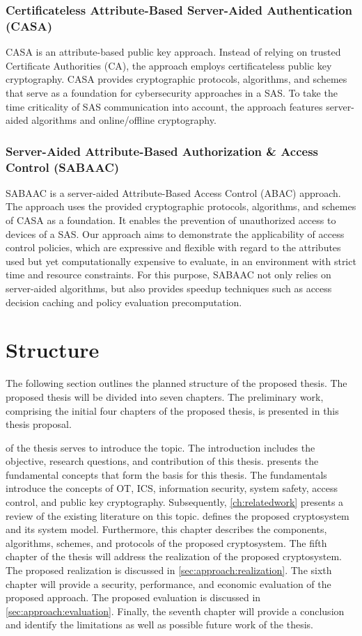 \subsubsection*{Certificateless Attribute-Based Server-Aided Authentication (CASA)}
CASA is an attribute-based public key approach.
Instead of relying on trusted Certificate Authorities (CA), the approach employs certificateless public key cryptography.
CASA provides cryptographic protocols, algorithms, and schemes that serve as a foundation for cybersecurity approaches in a SAS.
To take the time criticality of SAS communication into account, the approach features server-aided algorithms and online/offline cryptography.

\subsubsection*{Server-Aided Attribute-Based Authorization \& Access Control (SABAAC)}
SABAAC is a server-aided Attribute-Based Access Control (ABAC) approach.
The approach uses the provided cryptographic protocols, algorithms, and schemes of CASA as a foundation.
It enables the prevention of unauthorized access to devices of a SAS.
Our approach aims to demonstrate the applicability of access control policies, which are expressive and flexible with regard to the attributes used but yet computationally expensive to evaluate, in an environment with strict time and resource constraints.
For this purpose, SABAAC not only relies on server-aided algorithms, but also provides speedup techniques such as access decision caching and policy evaluation precomputation.

\section{Structure}
\label{sec:introduction:structure}
The following section outlines the planned structure of the proposed thesis.
The proposed thesis will be divided into seven chapters.
The preliminary work, comprising the initial four chapters of the proposed thesis, is presented in this thesis proposal.

 of the thesis serves to introduce the topic.
The introduction includes the objective, research questions, and contribution of this thesis.
 presents the fundamental concepts that form the basis for this thesis.
The fundamentals introduce the concepts of OT, ICS, information security, system safety, access control, and public key cryptography.
Subsequently, \cref{ch:relatedwork} presents a review of the existing literature on this topic.
 defines the proposed cryptosystem and its system model.
Furthermore, this chapter describes the components, algorithms, schemes, and protocols of the proposed cryptosystem.
The fifth chapter of the thesis will address the realization of the proposed cryptosystem.
The proposed realization is discussed in \cref{sec:approach:realization}.
The sixth chapter will provide a security, performance, and economic evaluation of the proposed approach.
The proposed evaluation is discussed in \cref{sec:approach:evaluation}.
Finally, the seventh chapter will provide a conclusion and identify the limitations as well as possible future work of the thesis.
